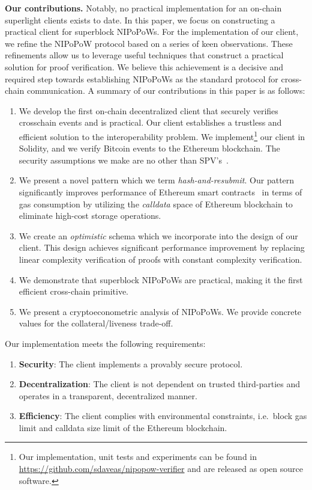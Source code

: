 \noindent
\textbf{Our contributions.}
Notably, no practical implementation for an on-chain superlight
clients exists to date. In this paper, we focus on constructing a practical
client for superblock NIPoPoWs.
For the implementation of our client, we refine the
NIPoPoW protocol based on a series of keen observations. These refinements
allow us to leverage useful techniques that construct a practical solution for
proof verification. We believe this achievement is a decisive and required step towards
establishing NIPoPoWs as the standard protocol for cross-chain communication.
A summary of our contributions in this paper is as follows:
\begin{enumerate}
\item We develop the first on-chain decentralized client that securely verifies
crosschain events and is practical. Our client establishes a trustless and
efficient solution to the interoperability problem. We implement\footnote{Our
implementation, unit tests and experiments can be found in \url{https://github.com/sdaveas/nipopow-verifier} and are released as open source software.}
our client
in Solidity, and we verify Bitcoin events to the Ethereum blockchain. The
security assumptions we make are no other than
SPV's~\cite{eclipse,eclipse-ethereum}.
\item We present a novel pattern which we term \emph{hash-and-resubmit}. Our
pattern significantly improves performance of Ethereum smart
contracts~\cite{wood,buterin} in terms of gas consumption by utilizing the
\emph{calldata} space of Ethereum blockchain to eliminate high-cost storage
operations.
\item We create an \emph{optimistic} schema which we incorporate into the design
of our client. This design achieves significant performance improvement by
replacing linear complexity verification of proofs with constant complexity
verification.
\item We demonstrate that superblock NIPoPoWs are practical,
making it the first efficient cross-chain primitive.
\item We present a cryptoeconometric analysis of NIPoPoWs.
We provide concrete values for the collateral/liveness trade-off.
\end{enumerate}

Our implementation meets the following requirements:
\begin{enumerate}
\item \textbf{Security}: The client implements a provably secure protocol.
\item \textbf{Decentralization}: The client is not dependent on trusted third-parties
and operates in a transparent, decentralized manner.
\item \textbf{Efficiency}: The client complies with environmental constraints, i.e.\
block gas limit and calldata size limit of the Ethereum blockchain.
\end{enumerate}

